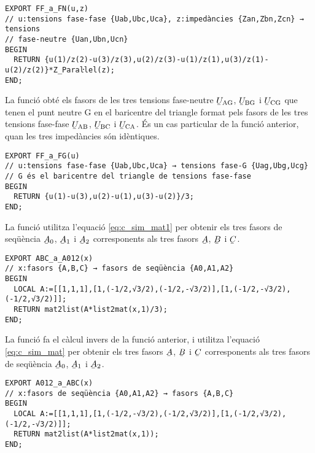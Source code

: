\begin{lstlisting}[caption={HP Prime --- Funció FF\_a\_FN}, label=lst:FFaFN]
EXPORT FF_a_FN(u,z)
// u:tensions fase-fase {Uab,Ubc,Uca}, z:impedàncies {Zan,Zbn,Zcn} → tensions
// fase-neutre {Uan,Ubn,Ucn}
BEGIN
  RETURN {u(1)/z(2)-u(3)/z(3),u(2)/z(3)-u(1)/z(1),u(3)/z(1)-u(2)/z(2)}*Z_Paraŀlel(z);
END;
\end{lstlisting}

La funció  obté els fasors de les tres tensions fase-neutre $\cmplx{U}\ped{AG}$, $\cmplx{U}\ped{BG}$ i $\cmplx{U}\ped{CG}$ que tenen el punt neutre G en el baricentre del triangle format pels fasors de  les tres tensions fase-fase
$\cmplx{U}\ped{AB}$, $\cmplx{U}\ped{BC}$ i $\cmplx{U}\ped{CA}$. És un cas particular de la funció anterior, quan les tres impedàncies són idèntiques.

\begin{lstlisting}[caption={HP Prime --- Funció FF\_a\_FG}, label=lst:FFaFG]
EXPORT FF_a_FG(u)
// u:tensions fase-fase {Uab,Ubc,Uca} → tensions fase-G {Uag,Ubg,Ucg}
// G és el baricentre del triangle de tensions fase-fase
BEGIN
  RETURN {u(1)-u(3),u(2)-u(1),u(3)-u(2)}/3;
END;
\end{lstlisting}

La funció  utilitza l'equació \eqref{eq:c_sim_mat1} per obtenir els tres fasors de seqüència
$\cmplx{A}_0$, $\cmplx{A}_1$ i  $\cmplx{A}_2$ corresponents als tres fasors $\cmplx{A}$, $\cmplx{B}$ i $\cmplx{C}$.

\begin{lstlisting}[caption={HP Prime --- Funció ABC\_a\_A012}, label=lst:ABCaA012]
EXPORT ABC_a_A012(x)
// x:fasors {A,B,C} → fasors de seqüència {A0,A1,A2}
BEGIN
  LOCAL A:=[[1,1,1],[1,(-1/2,√3/2),(-1/2,-√3/2)],[1,(-1/2,-√3/2),(-1/2,√3/2)]];
  RETURN mat2list(A*list2mat(x,1)/3);
END;
\end{lstlisting}

La funció  fa el càlcul  invers de la funció anterior, i utilitza l'equació \eqref{eq:c_sim_mat} per obtenir els tres fasors
$\cmplx{A}$, $\cmplx{B}$ i $\cmplx{C}$  corresponents als tres fasors de seqüència
$\cmplx{A}_0$, $\cmplx{A}_1$ i  $\cmplx{A}_2$.

\begin{lstlisting}[caption={HP Prime --- Funció A012\_a\_ABC}, label=lst:A012aABC]
EXPORT A012_a_ABC(x)
// x:fasors de seqüència {A0,A1,A2} → fasors {A,B,C}
BEGIN
  LOCAL A:=[[1,1,1],[1,(-1/2,-√3/2),(-1/2,√3/2)],[1,(-1/2,√3/2),(-1/2,-√3/2)]];
  RETURN mat2list(A*list2mat(x,1));
END;
\end{lstlisting}

